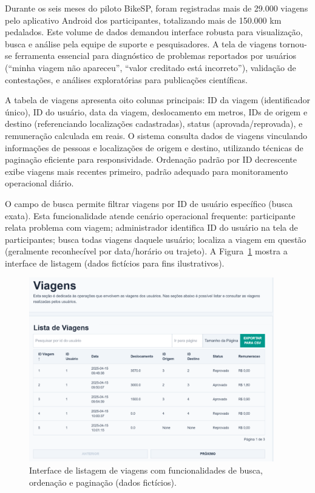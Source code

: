 

Durante os seis meses do piloto BikeSP, foram registradas mais de 29.000 viagens pelo aplicativo Android dos participantes, totalizando mais de 150.000 km pedalados. Este volume de dados demandou interface robusta para visualização, busca e análise pela equipe de suporte e pesquisadores. A tela de viagens tornou-se ferramenta essencial para diagnóstico de problemas reportados por usuários (``minha viagem não apareceu'', ``valor creditado está incorreto''), validação de contestações, e análises exploratórias para publicações científicas.

A tabela de viagens apresenta oito colunas principais: ID da viagem (identificador único), ID do usuário, data da viagem, deslocamento em metros, IDs de origem e destino (referenciando localizações cadastradas), status (aprovada/reprovada), e remuneração calculada em reais. O sistema consulta dados de viagens vinculando informações de pessoas e localizações de origem e destino, utilizando técnicas de paginação eficiente para responsividade. Ordenação padrão por ID decrescente exibe viagens mais recentes primeiro, padrão adequado para monitoramento operacional diário.

O campo de busca permite filtrar viagens por ID de usuário específico (busca exata). Esta funcionalidade atende cenário operacional frequente: participante relata problema com viagem; administrador identifica ID do usuário na tela de participantes; busca todas viagens daquele usuário; localiza a viagem em questão (geralmente reconhecível por data/horário ou trajeto). A Figura~\ref{fig:viagens_listar} mostra a interface de listagem (dados fictícios para fins ilustrativos).

 \begin{figure}[htb]
   \centering
   \includegraphics[width=0.95\textwidth]{figuras/viagens_listar.png}
   \caption{Interface de listagem de viagens com funcionalidades de busca, ordenação e paginação (dados fictícios).}
   \label{fig:viagens_listar}
 \end{figure}

